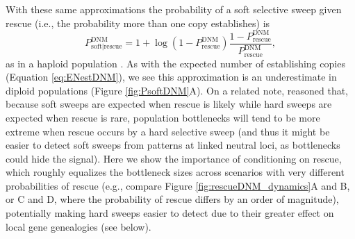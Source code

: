 \documentclass[]{article}
\begin{document}
With these same approximations the probability of a soft selective sweep given rescue (i.e., the probability more than one copy establishes) is 
\begin{equation}\label{eq:PsoftDNM}
P_{\mathrm{soft}|\mathrm{rescue}}^{\mathrm{DNM}} = 1 + \log(1-P_\mathrm{rescue}^\mathrm{DNM}) \frac{1-P_{\mathrm{rescue}}^{\mathrm{DNM}}}{P_{\mathrm{rescue}}^{\mathrm{DNM}}},
\end{equation}
as in a haploid population \citep[equation 8 in][]{wilson2017soft}.
As with the expected number of establishing copies (Equation \ref{eq:ENestDNM}), we see this approximation is an underestimate in diploid populations (Figure \ref{fig:PsoftDNM}A).
On a related note, \cite{wilson2017soft} reasoned that, because soft sweeps are expected when rescue is likely while hard sweeps are expected when rescue is rare, population bottlenecks will tend to be more extreme when rescue occurs by a hard selective sweep (and thus it might be easier to detect soft sweeps from patterns at linked neutral loci, as bottlenecks could hide the signal).
Here we show the importance of conditioning on rescue, which roughly equalizes the bottleneck sizes across scenarios with very different probabilities of rescue (e.g., compare Figure \ref{fig:rescueDNM_dynamics}A and B, or C and D, where the probability of rescue differs by an order of magnitude), potentially making hard sweeps easier to detect due to their greater effect on local gene genealogies (see below).
\end{document}
